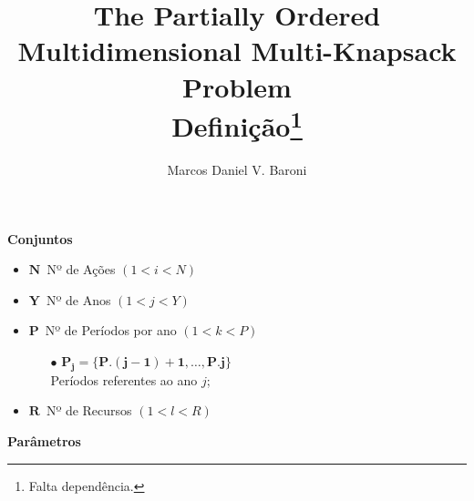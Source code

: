 \documentclass{article}
\title{The Partially Ordered Multidimensional Multi-Knapsack Problem \\ {Definição\footnote{Falta dependência.}} }
\author{Marcos Daniel V. Baroni}
\newcommand{\topico}[1]{
  \vspace{20pt}
  {\Large \bf #1 }
}
\newcommand{\variavel}[1]{
  { \Large $ \bm{ #1 } \, $}
}
\begin{document}
\maketitle

\topico{Conjuntos}

\begin{itemize}
  \item \variavel{N} Nº de Ações {\scriptsize $(1 < i < N) $}
  \item \variavel{Y} Nº de Anos  {\scriptsize $(1 < j < Y) $}
  \item \variavel{P} Nº de Períodos por ano {\scriptsize $(1 < k < P)$}
    \begin{itemize}
	  \item[$\bullet$]{\small $\bm{P_{j} = \{P.(j-1)+1, \ldots, P.j\}}$ \\ Períodos referentes ao ano $j$;} 
	\end{itemize}
  \item \variavel{R} Nº de Recursos {\scriptsize $(1 < l < R)$}
\end{itemize}

\topico{Parâmetros}
\end{document}
